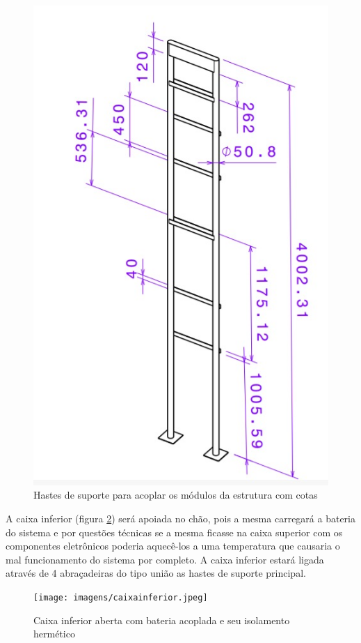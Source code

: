 \begin{figure}[H]
	\centering
    \includegraphics[keepaspectratio=true,scale=0.4]{figuras/hastes.jpeg}
    \caption{Hastes de suporte para acoplar os módulos da estrutura com cotas}
    \label{hastes}
\end{figure}

A caixa inferior (figura \ref{caixainf}) será apoiada no chão, pois a mesma carregará a bateria do sistema e por questões técnicas se a mesma ficasse na caixa superior com os componentes eletrônicos poderia aquecê-los a uma temperatura que causaria o mal funcionamento do sistema por completo. A caixa inferior estará ligada através de 4 abraçadeiras do tipo união as hastes de suporte principal.

\begin{figure}[H]
	\centering
    \texttt{[image: imagens/caixainferior.jpeg]}
    \caption{Caixa inferior aberta com bateria acoplada e seu isolamento hermético}
    \label{caixainf}
\end{figure}


